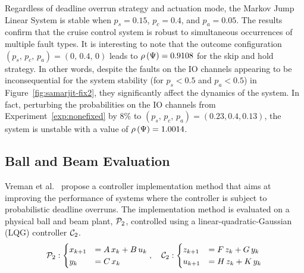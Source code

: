 Regardless of deadline overrun strategy and actuation mode, the Markov Jump Linear System is stable when $p_s=0.15$, $p_c=0.4$, and $p_a=0.05$.
The results confirm that the cruise control system is robust to simultaneous occurrences of multiple fault types.
It is interesting to note that the outcome configuration $(p_s,\, p_c,\, p_a) = (0,\, 0.4,\, 0)$ leads to $\rho\left( \Psi \right) = 0.9108$ for the skip and hold strategy.
In other words, despite the faults on the IO channels appearing to be inconsequential for the system stability (for $p_s < 0.5$ and $p_a < 0.5$) in Figure~\ref{fig:samarjit-fix2}, they significantly affect the dynamics of the system.
In fact, perturbing the probabilities on the IO channels from Experiment~\ref{exp:nonefixed} by 8\% to $(p_s,\, p_c,\, p_a) = (0.23, 0.4, 0.13)$, the system is unstable with a value of $\rho\left( \Psi \right) = 1.0014$.

%

\subsection{Ball and Beam Evaluation}%
\label{sec:nils}%
%
Vreman et al.~\cite{Vreman:2022} propose a controller implementation method that aims at improving the performance of systems where the controller is subject to probabilistic deadline overruns.
The implementation method is evaluated on a physical ball and beam plant, $\mathcal{P}_2$, controlled using a linear-quadratic-Gaussian (LQG) controller $\mathcal{C}_2$.
%
\begin{equation*}
    \mathcal{P}_2: \begin{cases}
        x_{k+1} &= A\,x_k+B\, u_k\\
        y_k &= C\,x_k
    \end{cases},\quad
    \mathcal{C}_2: \begin{cases}
        z_{k+1} &= F\,z_k+G\, y_k\\
        u_{k+1} &= H\,z_k+K\,y_k
    \end{cases}
\end{equation*}

